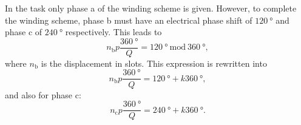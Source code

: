 \begin{solutionblock}
    In the task only phase a of the winding scheme is given. However, to complete the winding scheme, phase b must have an electrical phase shift of $\SI{120}{\degree}$ and phase c of $\SI{240}{\degree}$ respectively.
    This leads to
    \begin{equation}
        n_{\mathrm{b}} p \frac{\SI{360}{\degree}}{Q} = \SI{120}{\degree} \ \mathrm{mod} \ \SI{360}{\degree},
    \end{equation}
    where $n_{\mathrm{b}}$ is the displacement in slots. This expression is rewritten into
    \begin{equation}
        n_{\mathrm{b}} p \frac{\SI{360}{\degree}}{Q} = \SI{120}{\degree} + k \SI{360}{\degree},
        \label{eq:nb}
    \end{equation}
    and also for phase c:
    \begin{equation}
        n_{\mathrm{c}} p \frac{\SI{360}{\degree}}{Q} = \SI{240}{\degree} + k \SI{360}{\degree}.
        \label{eq:nc}
    \end{equation}


\end{solutionblock}
